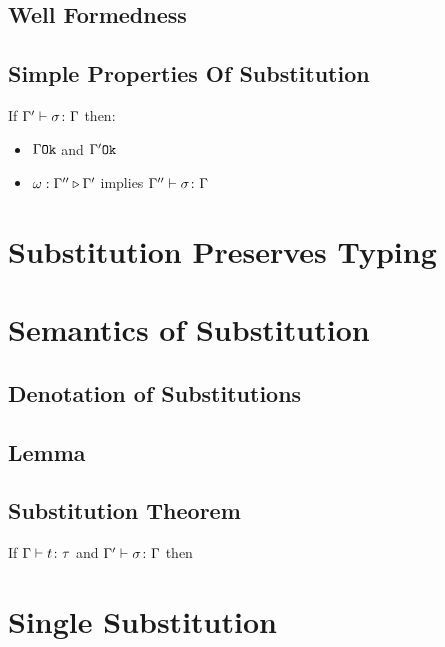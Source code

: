 {    \subsection{Well Formedness}
    \subsection{Simple Properties Of Substitution}
    If $\Gamma' \vdash \sigma \colon \Gamma$ then:
    \begin{itemize}
        \item $\Gamma \texttt{Ok}$ and $\Gamma' \texttt{Ok}$
        \item $\omega : \Gamma'' \triangleright \Gamma'$ implies $\Gamma'' \vdash \sigma \colon \Gamma$
    \end{itemize}

    \section{Substitution Preserves Typing}
    \section{Semantics of Substitution}
    \subsection{Denotation of Substitutions}
    \subsection{Lemma}
    \subsection{Substitution Theorem}

    If $\Gamma \vdash t \colon \tau$ and $\Gamma' \vdash \sigma \colon \Gamma$ then
    \section{Single Substitution}
}



\ifdefined\NoDocument
\else
\documentclass{report}


    \Substitution

\fi